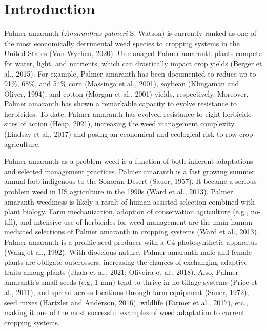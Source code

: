 \documentclass[utf8]{frontiersSCNS}
\begin{document}
\hypertarget{introduction}{%
\section*{Introduction}\label{introduction}}

Palmer amaranth (\emph{Amaranthus palmeri} S. Watson) is currently
ranked as one of the most economically detrimental weed species to
cropping systems in the United States (Van Wychen, 2020). Unmanaged
Palmer amaranth plants compete for water, light, and nutrients, which
can drastically impact crop yields (Berger et al., 2015). For example,
Palmer amaranth has been documented to reduce up to 91\%, 68\%, and 54\%
corn (Massinga et al., 2001), soybean (Klingaman and Oliver, 1994), and
cotton (Morgan et al., 2001) yields, respectively. Moreover, Palmer
amaranth has shown a remarkable capacity to evolve resistance to
herbicides. To date, Palmer amaranth has evolved resistance to eight
herbicide sites of action (Heap, 2021), increasing the weed management
complexity (Lindsay et al., 2017) and posing an economical and
ecological risk to row-crop agriculture.

Palmer amaranth as a problem weed is a function of both inherent
adaptations and selected management practices. Palmer amaranth is a fast
growing summer annual forb indigenous to the Sonoran Desert (Sauer,
1957). It became a serious problem weed in US agriculture in the 1990s
(Ward et al., 2013). Palmer amaranth weediness is likely a result of
human-assisted selection combined with plant biology. Farm
mechanization, adoption of conservation agriculture (e.g., no-till), and
intensive use of herbicides for weed management are the main
human-mediated selections of Palmer amaranth in cropping systems (Ward
et al., 2013). Palmer amaranth is a prolific seed producer with a C4
photosynthetic apparatus (Wang et al., 1992). With dioecious nature,
Palmer amaranth male and female plants are obligate outcrossers,
increasing the chances of exchanging adaptive traits among plants (Jhala
et al., 2021; Oliveira et al., 2018). Also, Palmer amaranth's small
seeds (e.g, 1 mm) tend to thrive in no-tillage systems (Price et al.,
2011), and spread across locations through farm equipment (Sauer, 1972),
seed mixes (Hartzler and Anderson, 2016), wildlife (Farmer et al.,
2017), etc., making it one of the most successful examples of weed
adaptation to current cropping systems.
\end{document}
